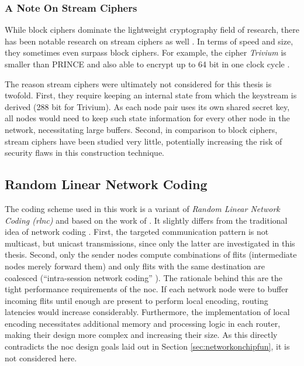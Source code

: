 \subsubsection{A Note On Stream Ciphers}
While block ciphers dominate the lightweight cryptography field of research, there has been notable research on stream ciphers as well
\cite[cf.][]{estream}. In terms of speed and size, they sometimes even surpass block ciphers. For example, the cipher \textit{Trivium}
\cite{decanniere06trivium} is smaller than PRINCE and also able to encrypt up to 64 bit in one clock cycle \cite[8]{harttung17lightweightcrypto}.

The reason stream ciphers were ultimately not considered for this thesis is twofold. First, they require keeping an internal state from which the
keystream is derived (288 bit for Trivium). As each node pair uses its own shared secret key, all nodes would need to keep such state information for
every other node in the network, necessitating large buffers. Second, in comparison to block ciphers, stream ciphers have been studied very little,
potentially increasing the risk of security flaws in this construction technique.

\subsection{Random Linear Network Coding}\label{sec:designnc}
The coding scheme used in this work is a variant of \textit{Random Linear Network Coding (\gls{rlnc})} and based on the work of
\citeauthor{moriam15manycorenc} \cite{moriam15manycorenc}. It slightly differs from the traditional idea of network coding
\cites{ahlswede00networkflow}{li03linearnc}. First, the targeted communication pattern is not multicast, but unicast transmissions, since only the
latter are investigated in this thesis. Second, only the sender nodes compute combinations of flits (intermediate nodes merely forward them) and only
flits with the same destination are coalesced (\enquote{intra-session network coding} \cite[1]{moriam15manycorenc}). The rationale behind this are the
tight performance requirements of the \gls{noc}. If each network node were to buffer incoming flits until enough are present to perform local
encoding, routing latencies would increase considerably. Furthermore, the implementation of local encoding necessitates additional memory and
processing logic in each router, making their design more complex and increasing their size. As this directly contradicts the \gls{noc} design goals
laid out in Section \ref{sec:networkonchipfun}, it is not considered here.

